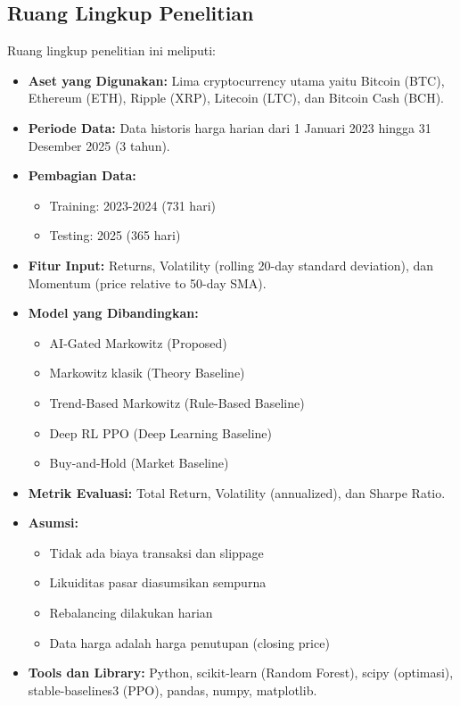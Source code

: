 \documentclass[12pt,a4paper]{article}
\begin{document}
\subsection{Ruang Lingkup Penelitian}

Ruang lingkup penelitian ini meliputi:

\begin{itemize}
    \item \textbf{Aset yang Digunakan:} Lima cryptocurrency utama yaitu Bitcoin (BTC), Ethereum (ETH), Ripple (XRP), Litecoin (LTC), dan Bitcoin Cash (BCH).
    
    \item \textbf{Periode Data:} Data historis harga harian dari 1 Januari 2023 hingga 31 Desember 2025 (3 tahun).
    
    \item \textbf{Pembagian Data:} 
    \begin{itemize}
        \item Training: 2023-2024 (731 hari)
        \item Testing: 2025 (365 hari)
    \end{itemize}
    
    \item \textbf{Fitur Input:} Returns, Volatility (rolling 20-day standard deviation), dan Momentum (price relative to 50-day SMA).
    
    \item \textbf{Model yang Dibandingkan:}
    \begin{itemize}
        \item AI-Gated Markowitz (Proposed)
        \item Markowitz klasik (Theory Baseline)
        \item Trend-Based Markowitz (Rule-Based Baseline)
        \item Deep RL PPO (Deep Learning Baseline)
        \item Buy-and-Hold (Market Baseline)
    \end{itemize}
    
    \item \textbf{Metrik Evaluasi:} Total Return, Volatility (annualized), dan Sharpe Ratio.
    
    \item \textbf{Asumsi:}
    \begin{itemize}
        \item Tidak ada biaya transaksi dan slippage
        \item Likuiditas pasar diasumsikan sempurna
        \item Rebalancing dilakukan harian
        \item Data harga adalah harga penutupan (closing price)
    \end{itemize}
    
    \item \textbf{Tools dan Library:} Python, scikit-learn (Random Forest), scipy (optimasi), stable-baselines3 (PPO), pandas, numpy, matplotlib.
\end{itemize}
\end{document}
